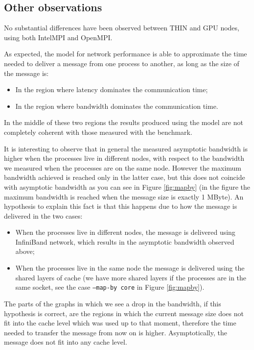\documentclass{article}
\begin{document}
\subsection{Other observations}

No substantial differences have been observed between THIN and GPU nodes, using both IntelMPI and OpenMPI.

As expected, the model for network performance is able to approximate the time needed to deliver a message from one process to another, as long as the size of the message is:
\begin{itemize}
    \item In the region where latency dominates the communication time;
    \item In the region where bandwidth dominates the communication time.
\end{itemize}
In the middle of these two regions the results produced using the model are not completely coherent with those measured with the benchmark.

It is interesting to observe that in general the measured asymptotic bandwidth is higher when the processes live in different nodes, with respect to the bandwidth we measured when the processes are on the same node. However the maximum bandwidth achieved is reached only in the latter case, but this does not coincide with asymptotic bandwidth as you can see in Figure \ref{fig:mapby} (in the figure the maximum bandwidth is reached when the message size is exactly 1 MByte). An hypothesis to explain this fact is that this happens due to how the message is delivered in the two cases:
\begin{itemize}
    \item When the processes live in different nodes, the message is delivered using InfiniBand network, which results in the asymptotic bandwidth observed above;
    \item When the processes live in the same node the message is delivered using the shared layers of cache (we have more shared layers if the processes are in the same socket, see the case \texttt{--map-by core} in Figure \ref{fig:mapby}).
\end{itemize}
The parts of the graphs in which we see a drop in the bandwidth, if this hypothesis is correct, are the regions in which the current message size does not fit into the cache level which was used up to that moment, therefore the time needed to transfer the message from now on is higher. Asymptotically, the message does not fit into any cache level.
\end{document}
